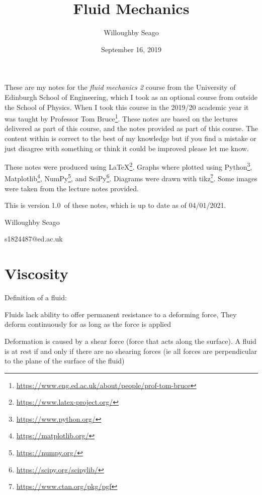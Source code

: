 \documentclass{article}
\title{Fluid Mechanics}
\date{September 16, 2019}
\author{Willoughby Seago}
\newcommand{\notesVersion}{1.0}
\newcommand{\notesDate}{04/01/2021}
\begin{document}
    \maketitle
    These are my notes for the \textit{fluid mechanics 2} course from the University of Edinburgh School of Engineering, which I took as an optional course from outside the School of Physics.
    When I took this course in the 2019/20 academic year it was taught by Professor Tom Bruce\footnote{\url{https://www.eng.ed.ac.uk/about/people/prof-tom-bruce}}.
    These notes are based on the lectures delivered as part of this course, and the notes provided as part of this course.
    The content within is correct to the best of my knowledge but if you find a mistake or just disagree with something or think it could be improved please let me know.
    
    These notes were produced using \LaTeX\footnote{\url{https://www.latex-project.org/}}.
    Graphs where plotted using Python\footnote{\url{https://www.python.org/}}, Matplotlib\footnote{\url{https://matplotlib.org/}}, NumPy\footnote{\url{https://numpy.org/}}, and SciPy\footnote{\url{https://scipy.org/scipylib/}}.
    Diagrams were drawn with tikz\footnote{\url{https://www.ctan.org/pkg/pgf}}.
    Some images were taken from the lecture notes provided.
    
    This is version \notesVersion~of these notes, which is up to date as of \notesDate.
    \begin{flushright}
        Willoughby Seago
        
        s1824487@ed.ac.uk
    \end{flushright}
    \clearpage
    \tableofcontents
    \listoffigures
    \listoftables
    \clearpage
    
    \section{Viscosity}
    Definition of a fluid:
    \begin{displayquote}
        Fluids lack ability to offer permanent resistance to a deforming force, They deform continuously for as long as the force is applied
    \end{displayquote}
    Deformation is caused by a shear force (force that acts along the surface). A fluid is at rest if and only if there are no shearing forces (ie all forces are perpendicular to the plane of the surface of the fluid)
    
\end{document}
